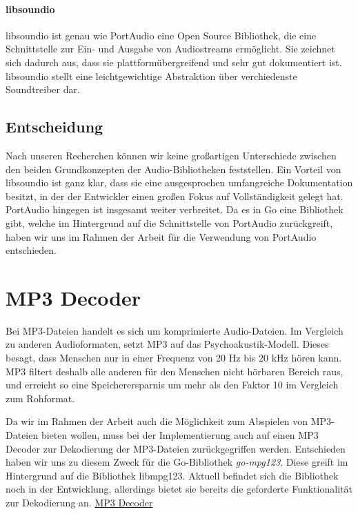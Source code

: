 \paragraph{libsoundio}
libsoundio ist genau wie PortAudio eine Open Source Bibliothek, die eine
Schnittstelle zur Ein- und Ausgabe von Audiostreams ermöglicht. Sie zeichnet
sich dadurch aus, dass sie plattformübergreifend und sehr gut dokumentiert ist.
libsoundio stellt eine leichtgewichtige Abstraktion über verchiedenste
Soundtreiber dar.

\subsection{Entscheidung}
Nach unseren Recherchen können wir keine großartigen Unterschiede zwischen den
beiden Grundkonzepten der Audio-Bibliotheken feststellen. Ein Vorteil von
libsoundio ist ganz klar, dass sie eine ausgesprochen umfangreiche
Dokumentation besitzt, in der der Entwickler einen großen Fokus auf
Vollständigkeit gelegt hat. PortAudio hingegen ist insgesamt weiter verbreitet.
Da es in Go eine Bibliothek gibt, welche im Hintergrund auf die Schnittstelle
von PortAudio zurückgreift, haben wir uns im Rahmen der Arbeit für die
Verwendung von PortAudio entschieden.

\section{MP3 Decoder}
Bei MP3-Dateien handelt es sich um komprimierte Audio-Dateien. Im Vergleich zu
anderen Audioformaten, setzt MP3 auf das Psychoakustik-Modell. Dieses besagt,
dass Menschen nur in einer Frequenz von 20 Hz bis 20 kHz hören kann. MP3
filtert deshalb alle anderen für den Menschen nicht hörbaren Bereich raus, und
erreicht so eine Speicherersparnis um mehr als den Faktor 10 im Vergleich zum
Rohformat. \hfill \break

Da wir im Rahmen der Arbeit auch die Möglichkeit zum Abspielen von MP3-Dateien
bieten wollen, muss bei der Implementierung auch auf einen MP3 Decoder zur
Dekodierung der MP3-Dateien zurückgegriffen werden. Entschieden haben wir uns
zu diesem Zweck für die Go-Bibliothek \textit{go-mpg123}. Diese greift im
Hintergrund auf die Bibliothek libmpg123. Aktuell befindet sich die Bibliothek
noch in der Entwicklung, allerdings bietet sie bereits die geforderte
Funktionalität zur Dekodierung an.
\href{https://github.com/bobertlo/go-mpg123}{MP3 Decoder}

